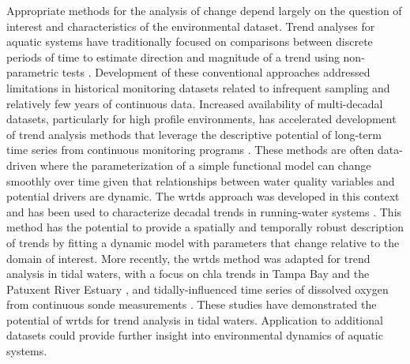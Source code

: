 \documentclass[journal = esthag, manuscript = article]{achemso}\usepackage[]{graphicx}\usepackage[]{color}
\begin{document}
Appropriate methods for the analysis of change depend largely on the question of interest and characteristics of the environmental dataset.  Trend analyses for aquatic systems have traditionally focused on comparisons between discrete periods of time to estimate direction and magnitude of a trend using non-parametric tests \cite{Hirsch91,Esterby96}. Development of these conventional approaches addressed limitations in historical monitoring datasets related to infrequent sampling and relatively few years of continuous data. Increased availability of multi-decadal datasets, particularly for high profile environments, has accelerated development of trend analysis methods that leverage the descriptive potential of long-term time series from continuous monitoring programs \cite{Bowes09,Halliday12}. These methods are often data-driven where the parameterization of a simple functional model can change smoothly over time given that relationships between water quality variables and potential drivers are dynamic.  The \ac{wrtds} approach was developed in this context and has been used to characterize decadal trends in running-water systems \cite{Hirsch10,Sprague11,Medalie12,Hirsch14,Pellerin14,Zhang16}. This method has the potential to provide a spatially and temporally robust description of trends by fitting a dynamic model with parameters that change relative to the domain of interest.  More recently, the \ac{wrtds} method was adapted for trend analysis in tidal waters, with a focus on \ac{chla} trends in Tampa Bay \cite{Beck15} and the Patuxent River Estuary \cite{Beck17}, and tidally-influenced time series of dissolved oxygen from continuous sonde measurements \cite{Beck15b}. These studies have demonstrated the potential of \ac{wrtds} for trend analysis in tidal waters. Application to additional datasets could provide further insight into environmental dynamics of aquatic systems. 
\end{document}
